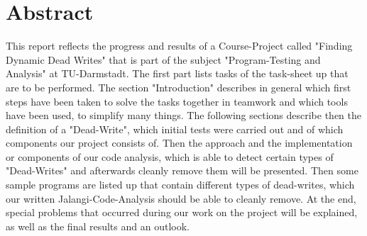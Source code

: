 \documentclass[a4paper]{scrartcl}
\begin{document}
\section{Abstract}
This report reflects the progress and results of a Course-Project called "Finding Dynamic Dead Writes" that is part of the subject "Program-Testing and Analysis" at TU-Darmstadt. The first part lists tasks of the task-sheet up that are to be performed. The section "Introduction" describes in general which first steps have been taken to solve the tasks together in teamwork and which tools have been used, to simplify many things. The following sections describe then the definition of a "Dead-Write", which initial tests were carried out and of which components our project consists of. Then the approach and the implementation or components of our code analysis, which is able to detect certain types of "Dead-Writes" and afterwards cleanly remove them will be presented. 
Then some sample programs are listed up that contain different types of dead-writes, which our written Jalangi-Code-Analysis should be able to cleanly remove. At the end, special problems that occurred during our work on the project will be explained, as well as the final results and an outlook.
\end{document}
